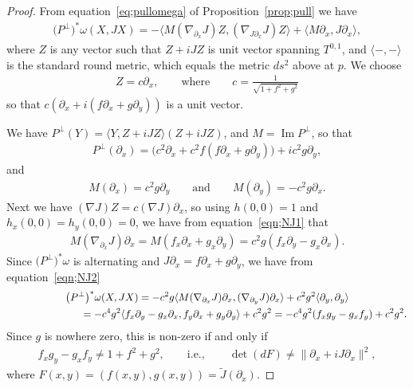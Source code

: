 \documentclass[10pt,a4paper]{amsart}
\numberwithin{equation}{section}
\begin{document}
\begin{proof}
From equation~\eqref{eq;pullomega} of Proposition~\ref{prop;pull} we have
\begin{gather*}
\big(P^\perp\big)^*\omega(X,JX) = - \langle M ( \nabla_{\partial_x} J ) Z, ( \nabla_{J \partial_x} J ) Z \rangle +
 \langle M \partial_x , J\partial_x \rangle,
\end{gather*}
where $Z$ is any vector such that $Z + iJZ$ is unit vector spanning $T^{0,1}$, and $ \langle - , - \rangle$ is the standard round metric, which equals the metric $ds^2$ above at $p$. We choose
\begin{gather*}
Z = c \partial_x, \qquad \textrm{where} \qquad c = \frac{1}{\sqrt{1+f^2+g^2}}
\end{gather*}
so that $c(\partial_x + i (f \partial_x + g \partial_y ) )$ is a unit vector.

We have $P^\perp(Y) = \langle Y, Z+iJZ \rangle (Z+iJZ)$, and $M= \operatorname{Im} P^\perp$, so that
\begin{gather*}
P^\perp(\partial_x) = \big( c^2 \partial_x + c^2 f ( f \partial_x + g \partial_y ) \big) + i c^2 g \partial_y ,
\end{gather*}
and
\begin{gather*}
M(\partial_x) = c^2 g \partial_y \qquad \textrm{and} \qquad M(\partial_y) = -c^2 g \partial_x.
\end{gather*}
Next we have $ (\nabla J) Z = c (\nabla J) \partial_x $, so using $h(0,0) =1$ and $h_x(0,0) = h_y(0,0) =0$, we have from equation~\eqref{eqn;NJ1} that
\begin{gather*}
M( \nabla_{\partial_x} J) \partial_x = M ( f_x \partial_x + g_x \partial_y ) = c^2 g ( f_x \partial_y - g_x \partial_x ).
\end{gather*}
Since $\big(P^\perp\big)^*\omega$ is alternating and $J \partial_x = f \partial_x + g \partial_y$, we have from equation~\eqref{eqn;NJ2}
\begin{gather*}
\big(P^\perp\big)^*\omega(X,JX) =-c^2 g \langle M ( \nabla_{\partial_x} J) \partial_x , ( \nabla_{\partial_y} J ) \partial_x \rangle +
 c^2 g^2 \langle \partial_y , \partial_y \rangle \\
\hphantom{\big(P^\perp\big)^*\omega(X,JX)}{} =-c^4 g^2 \langle f_x \partial_y - g_x \partial_x , f_y \partial_x + g_y \partial_y \rangle + c^2 g^2 = -c^4 g^2 (f_x g_y - g_x f_y )
 + c^2 g^2.
 \end{gather*}
Since $g$ is nowhere zero, this is non-zero if and only if
\begin{gather*}
f_x g_y - g_x f_y \neq 1+f^2+g^2, \qquad \text{i.e.}, \qquad
\det(dF) \neq \|\partial_x + i J \partial_x \|^2,
\end{gather*}
where $F(x,y) = (f(x,y),g(x,y)) = \tilde J (\partial_x)$.
\end{proof}
\end{document}
